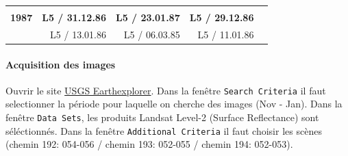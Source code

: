 \documentclass[a4paper, notitlepage, 12pt, krantz2]{krantz}
\let\oldparagraph\paragraph
\renewcommand{\paragraph}[1]{\oldparagraph{#1}\mbox{}}
\begin{document}
\begin{longtable}[]{@{}rrrrr@{}}
\begin{minipage}[t]{0.18\columnwidth}
\strut
\end{minipage}\tabularnewline
\begin{minipage}[t]{0.07\columnwidth}\raggedleft
\textbf{1987}\strut
\end{minipage} & \begin{minipage}[t]{0.20\columnwidth}\raggedleft
\textbf{L5 / 31.12.86}\strut
\end{minipage} & \begin{minipage}[t]{0.20\columnwidth}\raggedleft
\textbf{L5 / 23.01.87}\strut
\end{minipage} & \begin{minipage}[t]{0.20\columnwidth}\raggedleft
\textbf{L5 / 29.12.86}\strut
\end{minipage} & \begin{minipage}[t]{0.18\columnwidth}\raggedleft
\strut
\end{minipage}\tabularnewline
\begin{minipage}[t]{0.07\columnwidth}\raggedleft
1986\strut
\end{minipage} & \begin{minipage}[t]{0.20\columnwidth}\raggedleft
L5 / 13.01.86\strut
\end{minipage} & \begin{minipage}[t]{0.20\columnwidth}\raggedleft
L5 / 06.03.85\strut
\end{minipage} & \begin{minipage}[t]{0.20\columnwidth}\raggedleft
L5 / 11.01.86\strut
\end{minipage} & \begin{minipage}[t]{0.18\columnwidth}\raggedleft
\strut
\end{minipage}\tabularnewline
\bottomrule
\end{longtable}

\hypertarget{acquisition-des-images}{%
\paragraph{Acquisition des images}\label{acquisition-des-images}}

Ouvrir le site \href{https://earthexplorer.usgs.gov}{USGS Earthexplorer}. Dans la fenêtre \texttt{Search\ Criteria} il faut selectionner la période pour laquelle on cherche des images (Nov - Jan). Dans la fenêtre \texttt{Data\ Sets}, les produits Landsat Level-2 (Surface Reflectance) sont séléctionnés. Dans la fenêtre \texttt{Additional\ Criteria} il faut choisir les scènes (chemin 192: 054-056 / chemin 193: 052-055 / chemin 194: 052-053).
\end{document}
